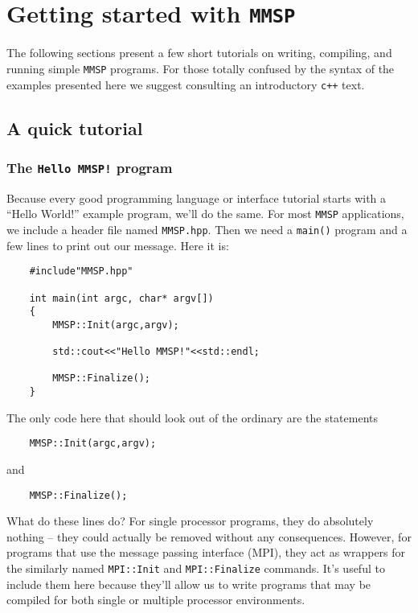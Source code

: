 
\chapter{Getting started with {\tt MMSP}}
The following sections present a few short tutorials on writing, compiling, and running simple {\tt MMSP} programs.  For those totally confused by the syntax of the examples presented here we suggest consulting an introductory {\tt c++} text.

\section{A quick tutorial}
\subsection{The {\tt Hello MMSP!} program}
Because every good programming language or interface tutorial starts with a ``Hello World!'' example program, we'll do the same.  For most {\tt MMSP} applications, we include a header file named {\tt MMSP.hpp}.  Then we need a {\tt main()} program and a few lines to print out our message.  Here it is:
\begin{shadebox}
\begin{verbatim}
    #include"MMSP.hpp"

    int main(int argc, char* argv[])
    {
        MMSP::Init(argc,argv);

        std::cout<<"Hello MMSP!"<<std::endl;

        MMSP::Finalize();
    }
\end{verbatim}
\end{shadebox}
The only code here that should look out of the ordinary are the statements
\begin{shadebox}
\begin{verbatim}
    MMSP::Init(argc,argv);
\end{verbatim}
\end{shadebox}
and
\begin{shadebox}
\begin{verbatim}
    MMSP::Finalize();
\end{verbatim}
\end{shadebox}
What do these lines do?  For single processor programs, they do absolutely nothing -- they could actually be removed without any consequences.  However, for programs that use the message passing interface (MPI), they act as wrappers for the similarly named {\tt MPI::Init} and {\tt MPI::Finalize} commands.  It's useful to include them here because they'll allow us to write programs that may be compiled for both single or multiple processor environments.

